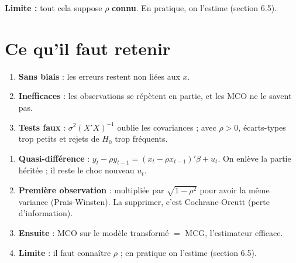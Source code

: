\documentclass[12pt,a4paper]{article}
\begin{document}
\textbf{Limite :} tout cela suppose $\rho$ \textbf{connu}. En pratique, on l'estime (section 6.5).

\section*{Ce qu'il faut retenir}

\begin{retenir}[title={6.3 -- Les MCO avec des erreurs AR(1)}]
\begin{enumerate}
\item \textbf{Sans biais} : les erreurs restent non liées aux $x$.
\item \textbf{Inefficaces} : les observations se répètent en partie, et les MCO ne le savent pas.
\item \textbf{Tests faux} : $\sigma^2(X'X)^{-1}$ oublie les covariances ; avec $\rho>0$, écarts-types trop petits et rejets de $H_0$ trop fréquents.
\end{enumerate}
\end{retenir}

\begin{retenir}[title={6.4 -- La solution (MCG, $\rho$ connu)}]
\begin{enumerate}
\item \textbf{Quasi-différence} : $y_t-\rho y_{t-1}=(x_t-\rho x_{t-1})'\beta+u_t$. On enlève la partie héritée ; il reste le choc nouveau $u_t$.
\item \textbf{Première observation} : multipliée par $\sqrt{1-\rho^2}$ pour avoir la même variance (Prais-Winsten). La supprimer, c'est Cochrane-Orcutt (perte d'information).
\item \textbf{Ensuite} : MCO sur le modèle transformé $=$ MCG, l'estimateur efficace.
\item \textbf{Limite} : il faut connaître $\rho$ ; en pratique on l'estime (section 6.5).
\end{enumerate}
\end{retenir}
\end{document}
